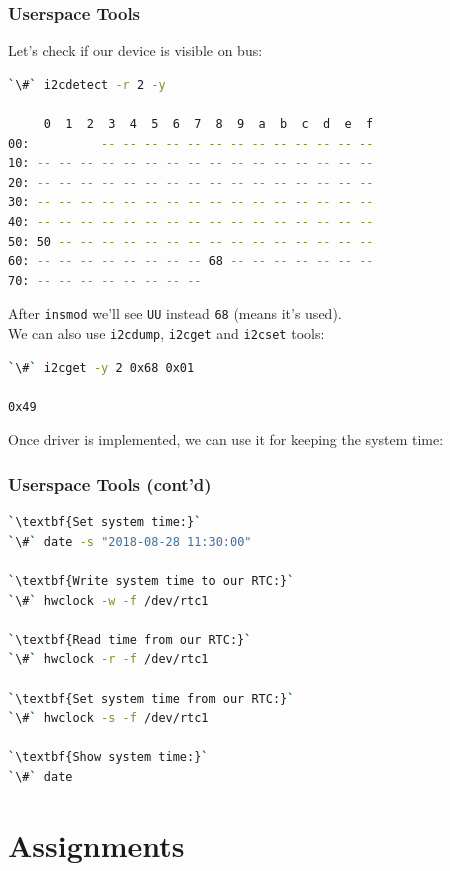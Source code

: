 \documentclass[aspectratio=169,usenames,dvipsnames]{beamer}
\newcounter{cont}
\begin{document}
\begin{frame}[containsverbatim]
  \frametitle{Userspace Tools}
  Let's check if our device is visible on bus:
  \begin{lstlisting}[language=bash]
`\#` i2cdetect -r 2 -y

     0  1  2  3  4  5  6  7  8  9  a  b  c  d  e  f
00:          -- -- -- -- -- -- -- -- -- -- -- -- --
10: -- -- -- -- -- -- -- -- -- -- -- -- -- -- -- --
20: -- -- -- -- -- -- -- -- -- -- -- -- -- -- -- --
30: -- -- -- -- -- -- -- -- -- -- -- -- -- -- -- --
40: -- -- -- -- -- -- -- -- -- -- -- -- -- -- -- --
50: 50 -- -- -- -- -- -- -- -- -- -- -- -- -- -- --
60: -- -- -- -- -- -- -- -- 68 -- -- -- -- -- -- --
70: -- -- -- -- -- -- -- --
  \end{lstlisting}

  After \texttt{insmod} we'll see \texttt{UU} instead \texttt{68}
  (means it's used).\\
  We can also use \texttt{i2cdump}, \texttt{i2cget} and \texttt{i2cset} tools:
  \begin{lstlisting}[language=bash]
`\#` i2cget -y 2 0x68 0x01

0x49
  \end{lstlisting}
  \vspace*{-2mm}
\end{frame}

\begin{frame}[containsverbatim]
  Once driver is implemented, we can use it for keeping the system time:
  \frametitle{Userspace Tools (cont'd)}
  \begin{lstlisting}[language=bash]
`\textbf{Set system time:}`
`\#` date -s "2018-08-28 11:30:00"

`\textbf{Write system time to our RTC:}`
`\#` hwclock -w -f /dev/rtc1

`\textbf{Read time from our RTC:}`
`\#` hwclock -r -f /dev/rtc1

`\textbf{Set system time from our RTC:}`
`\#` hwclock -s -f /dev/rtc1

`\textbf{Show system time:}`
`\#` date
  \end{lstlisting}
\end{frame}


\section{Assignments}
\end{document}
